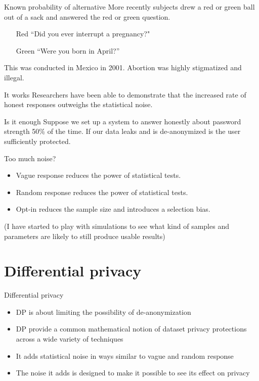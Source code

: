 \documentclass[xcolor={dvipsnames,table,hyperref}]{beamer}
\begin{document}
\begin{frame}{Known probability of alternative}
  More recently subjects drew a red or green ball out of a sack and answered the red or green question. \cite{LaraETAL06:RRT}
  \begin{itemize}
    \item[Red] “Did you ever interrupt a pregnancy?"
    \item[Green] “Were you born in April?”
  \end{itemize}
  This was conducted in Mexico in 2001. Abortion was highly stigmatized and illegal.
\end{frame}

\begin{frame}{It works}
  Researchers have been able to demonstrate that the increased rate of honest responses outweighs the statistical noise.
\end{frame}

\begin{frame}{Is it enough}
  Suppose we set up a system to answer honestly about password strength 50\% of the time.
  If our data leaks and is de-anonymized is the user sufficiently protected.
\end{frame}

\begin{frame}{Too much noise?}
  \begin{itemize}
    \item Vague response reduces the power of statistical tests.
    \item Random response reduces the power of statistical tests.
    \item Opt-in reduces the sample size and introduces a selection bias.
  \end{itemize}
  (I have started to play with simulations to see what kind of samples and parameters are likely to still produce usable results)
\end{frame}

\section{Differential privacy}

\begin{frame}{Differential privacy}
  \begin{itemize}
    \item DP is about limiting the possibility of de-anonymization
    \item DP provide a common mathematical notion of dataset privacy protections across a wide variety of techniques
    \item It adds statistical noise in ways similar to vague and random response
    \item The noise it adds is designed to make it possible to see its effect on privacy
  \end{itemize}
\end{frame}
\end{document}
